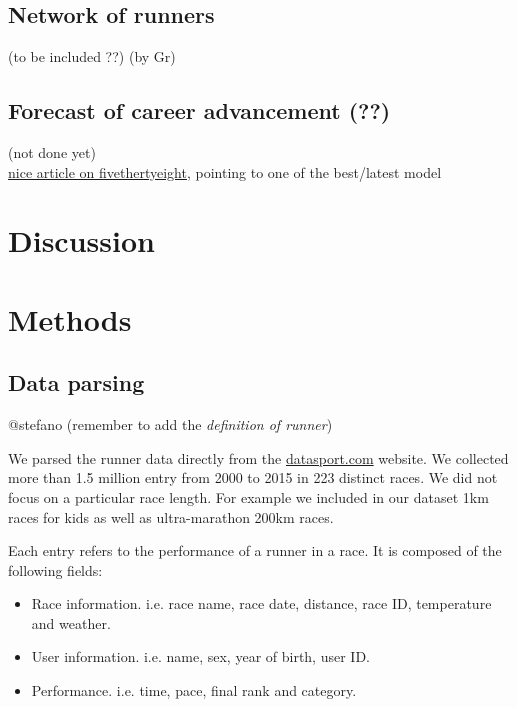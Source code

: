 \documentclass[fleqn,10pt]{wlscirep}
\begin{document}
		\subsection*{Network of runners}
	
				(to be included ??)
				(by Gr)
		
		\subsection*{Forecast of career advancement (??)}
	
				(not done yet)		\\
				\href{https://fivethirtyeight.com/features/tell-us-two-things-and-well-tell-you-how-fast-youd-run-a-marathon/}{nice article on fivethertyeight},
				pointing to one of the best/latest model \cite{vickers2016empirical}

	

\section*{Discussion}


\section*{Methods}


	\subsection*{Data parsing}
	
		@stefano 
		(remember to add the \textit{definition of runner})
	
        We parsed the runner data directly from the \url{datasport.com} website. 
        We collected more than 1.5 million entry from 2000 to 2015 in 223 distinct races.
        We did not focus on a particular race length. For example we included in our dataset 
        1km races for kids as well as ultra-marathon 200km races.

        Each entry refers to the performance of a runner in a race. It is composed of the following 
        fields:
        \begin{itemize}
            \item Race information. i.e. race name, race date, distance, race ID, temperature and weather.
            \item User information. i.e. name, sex, year of birth, user ID.
            \item Performance. i.e. time, pace, final rank and category.
        \end{itemize}
\end{document}
